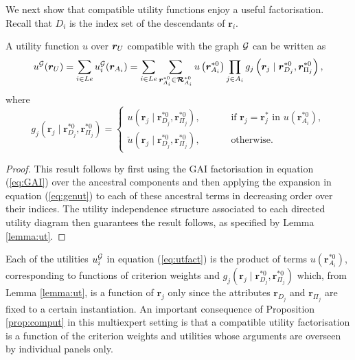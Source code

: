 We next show that compatible utility functions enjoy a useful factorisation. Recall that $D_i$ is the index set of the descendants of $\bm{r}_i$.
\begin{proposition}
\label{prop:comput}
A utility function $u$ over $\bm{r}_{U}$ compatible with the graph $\mathcal{G}$ can be written as
\begin{equation}
\label{eq:utfact}
u^\Gr(\bm{r}_{\UT})=\sum_{i\in Le}u_i^\Gr(\bm{r}_{A_i})=\sum_{i\in Le}\sum_{\bm{r}_{A_i}^{*0}\in \bm{\mathcal{R}}_{A_i}^{*0}}u\left(\bm{r}_{A_i}^{*0}\right)\prod_{j\in A_i}g_j\left(\bm{r}_j\;|\;\bm{r}_{D_j}^{*0},\bm{r}_{\Pi_j}^{*0}\right),
\end{equation}
where 
\begin{equation*}
g_j\left(\bm{r}_j\;|\;\bm{r}_{D_j}^{*0},\bm{r}_{\Pi_j}^{*0}\right)=\left\{
\begin{array}{lcccl}
u\left(\bm{r}_j\;|\;\bm{r}_{D_j}^{*0},\bm{r}_{\Pi_j}^{*0}\right),&&&& \mbox{if } \bm{r}_j=\bm{r}_j^* \mbox{ in } u\left(\bm{r}^{*0}_{A_i}\right),\\
\check{u}\left(\bm{r}_j\;|\;\bm{r}_{D_j}^{*0},\bm{r}_{\Pi_j}^{*0}\right),&&&& \mbox{otherwise.}
\end{array}
\right.
\end{equation*}
\end{proposition}
\begin{proof}
This result follows by first using the GAI factorisation in equation (\ref{eq:GAI}) over the ancestral components and then applying the expansion in equation (\ref{eq:genut}) to each of these ancestral terms in decreasing order over their indices. The utility independence structure associated to each directed utility diagram then guarantees the result follows, as specified by Lemma \ref{lemma:ut}.
\end{proof}

 Each of the utilities $u_i^{\mathcal{G}}$ in equation (\ref{eq:utfact}) is the product of terms $u(\bm{r}_{A_i}^{*0})$, corresponding to functions of criterion weights \citep{French2000b} and $g_j(\bm{r}_j\;|\;\bm{r}_{D_j}^{*0},\bm{r}_{\Pi_j}^{*0})$ which, from Lemma \ref{lemma:ut}, is a function of $\bm{r}_j$ only since the attributes  $\bm{r}_{D_j}$ and $\bm{r}_{\Pi_j}$ are fixed to a certain instantiation. An important consequence of Proposition \ref{prop:comput} in this multiexpert setting is that a compatible utility factorisation is a function of the criterion weights and utilities whose arguments are overseen by individual panels only.
 
